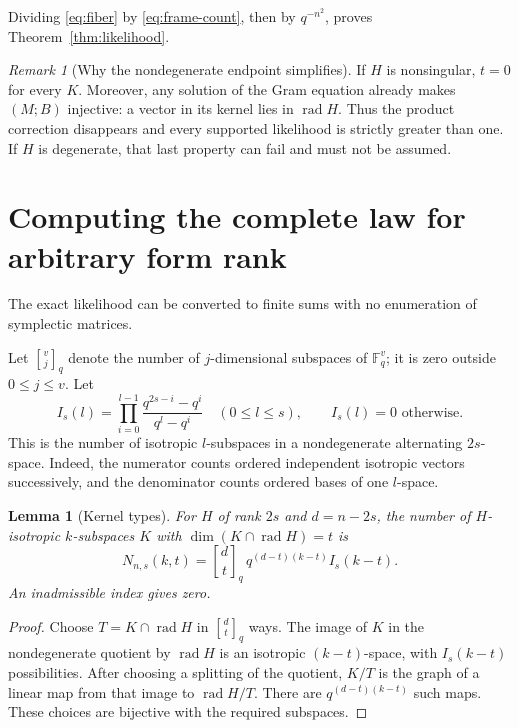 \documentclass[11pt]{article}
\newcommand{\F}{\mathbb F_q}
\newcommand{\rad}{\operatorname{rad}}
\newcommand{\1}{\mathbf 1}
\newcommand{\gb}[2]{\genfrac{[}{]}{0pt}{}{#1}{#2}_{q}}
\newtheorem{lemma}[theorem]{Lemma}
\theoremstyle{definition}
\theoremstyle{remark}
\newtheorem{remark}[theorem]{Remark}
\numberwithin{equation}{section}
\begin{document}
Dividing \eqref{eq:fiber} by \eqref{eq:frame-count}, then by $q^{-n^2}$, proves Theorem~\ref{thm:likelihood}.

\begin{remark}[Why the nondegenerate endpoint simplifies]
If $H$ is nonsingular, $t=0$ for every $K$. Moreover, any solution of the Gram equation already makes $(M;B)$ injective: a vector in its kernel lies in $\rad H$. Thus the product correction disappears and every supported likelihood is strictly greater than one. If $H$ is degenerate, that last property can fail and must not be assumed.
\end{remark}

\section{Computing the complete law for arbitrary form rank}
The exact likelihood can be converted to finite sums with no enumeration of symplectic matrices.

Let $\gb{v}{j}$ denote the number of $j$-dimensional subspaces of $\F^v$; it is zero outside $0\le j\le v$. Let
\begin{equation}\label{eq:isocount}
I_s(l)=\prod_{i=0}^{l-1}\frac{q^{2s-i}-q^i}{q^l-q^i}
\quad(0\le l\le s),\qquad I_s(l)=0\text{ otherwise}.
\end{equation}
This is the number of isotropic $l$-subspaces in a nondegenerate alternating $2s$-space. Indeed, the numerator counts ordered independent isotropic vectors successively, and the denominator counts ordered bases of one $l$-space.

\begin{lemma}[Kernel types]\label{lem:types}
For $H$ of rank $2s$ and $d=n-2s$, the number of $H$-isotropic $k$-subspaces $K$ with $\dim(K\cap\rad H)=t$ is
\begin{equation}\label{eq:types}
N_{n,s}(k,t)=\gb{d}{t}\,q^{(d-t)(k-t)}I_s(k-t).
\end{equation}
An inadmissible index gives zero.
\end{lemma}
\begin{proof}
Choose $T=K\cap\rad H$ in $\gb{d}{t}$ ways. The image of $K$ in the nondegenerate quotient by $\rad H$ is an isotropic $(k-t)$-space, with $I_s(k-t)$ possibilities. After choosing a splitting of the quotient, $K/T$ is the graph of a linear map from that image to $\rad H/T$. There are $q^{(d-t)(k-t)}$ such maps. These choices are bijective with the required subspaces.
\end{proof}
\end{document}
